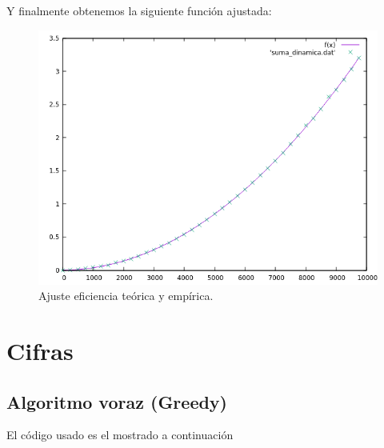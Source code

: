 Y finalmente obtenemos la siguiente función ajustada:
\begin{figure}[H]
    \begin{center}
        \includegraphics[scale=0.7]{imagenes/suma_dinamica_adj.png}
        \caption{Ajuste eficiencia teórica y empírica.}
        \label{fig20}
    \end{center}
\end{figure}



\section{Cifras}

\subsection{Algoritmo voraz (Greedy)}
El código usado es el mostrado a continuación

